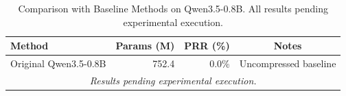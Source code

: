 \begin{table}[t]
\centering
\caption{Comparison with Baseline Methods on Qwen3.5-0.8B. All results pending experimental execution.}
\label{tab:baseline_comparison}
\begin{tabular}{l|r|r|c}
\toprule
Method & Params (M) & PRR (\%) & Notes \\
\midrule
Original Qwen3.5-0.8B & 752.4 & 0.0\% & Uncompressed baseline \\
\multicolumn{4}{c}{\textit{Results pending experimental execution.}} \\
\bottomrule
\end{tabular}
\end{table}
